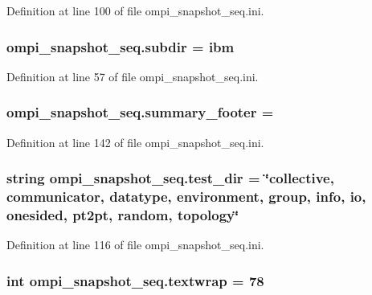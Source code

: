 Definition at line 100 of file ompi\-\_\-snapshot\-\_\-seq.\-ini.

\hypertarget{namespaceompi__snapshot__seq_a9d517656629849b65e1dcefbcf9cfd73}{
\subsubsection[{subdir}]{\setlength{\rightskip}{0pt plus 5cm}ompi\-\_\-snapshot\-\_\-seq.\-subdir = ibm}}\label{namespaceompi__snapshot__seq_a9d517656629849b65e1dcefbcf9cfd73}


Definition at line 57 of file ompi\-\_\-snapshot\-\_\-seq.\-ini.

\hypertarget{namespaceompi__snapshot__seq_ae564d5d2ad344e6edd9fe25c04553c4f}{
\subsubsection[{summary\-\_\-footer}]{\setlength{\rightskip}{0pt plus 5cm}ompi\-\_\-snapshot\-\_\-seq.\-summary\-\_\-footer =}}\label{namespaceompi__snapshot__seq_ae564d5d2ad344e6edd9fe25c04553c4f}


Definition at line 142 of file ompi\-\_\-snapshot\-\_\-seq.\-ini.

\hypertarget{namespaceompi__snapshot__seq_ae15b0abc55bc72ce7a7a4ebe56fc2dfe}{
\subsubsection[{test\-\_\-dir}]{\setlength{\rightskip}{0pt plus 5cm}string ompi\-\_\-snapshot\-\_\-seq.\-test\-\_\-dir = \char`\"{}collective, communicator, datatype, environment, group, info, io, onesided, pt2pt, random, topology\char`\"{}}}\label{namespaceompi__snapshot__seq_ae15b0abc55bc72ce7a7a4ebe56fc2dfe}


Definition at line 116 of file ompi\-\_\-snapshot\-\_\-seq.\-ini.

\hypertarget{namespaceompi__snapshot__seq_a81239e350a24a25aa3a329f330a267f4}{
\subsubsection[{textwrap}]{\setlength{\rightskip}{0pt plus 5cm}int ompi\-\_\-snapshot\-\_\-seq.\-textwrap = 78}}\label{namespaceompi__snapshot__seq_a81239e350a24a25aa3a329f330a267f4}


